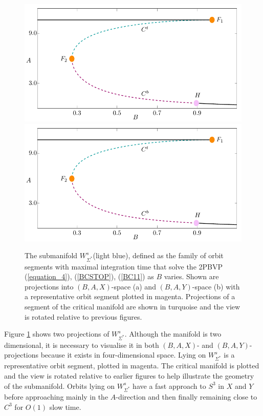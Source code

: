 \documentclass{ws-ijbc}
\begin{document}
\begin{figure}[ht]
\centering
\includegraphics[width=\textwidth, height=0.42\textheight, page=7]{figures.pdf}
\includegraphics[width=\textwidth, height=0.42\textheight, page=8]{figures.pdf}
\caption{The submanifold $W^{s}_{\Sigma^*}$(light blue), defined as the family of orbit segments with maximal integration time that solve the 2PBVP (\ref{equation_4}), (\ref{BCSTOP}), (\ref{BC11}) as $B$ varies.  Shown are projections into $(B,A,X)$-space (a) and $(B,A,Y)$-space (b) with a representative orbit segment plotted in magenta.  Projections of a segment of the critical manifold are shown in turquoise and the view is rotated relative to previous figures.}
\label{piece}
\end{figure}
   
Figure \ref{piece} shows two projections of $W^s_{\Sigma^*}$.  Although the manifold is two dimensional, it is necessary to visualise it in both $(B,A,X)$- and $(B,A,Y)$-projections because it exists in four-dimensional space.  Lying on $W^s_{\Sigma^*}$ is a representative orbit segment, plotted in magenta.  The critical manifold is plotted and the view is rotated relative to earlier figures to help illustrate the geometry of the submanifold.  Orbits lying on $W^s_{\Sigma^*}$ have a fast approach to $S^3$ in $X$ and $Y$ before approaching mainly in the $A$-direction and then finally remaining close to $C^3$ for $O(1)$ slow time.
    
\end{document}
